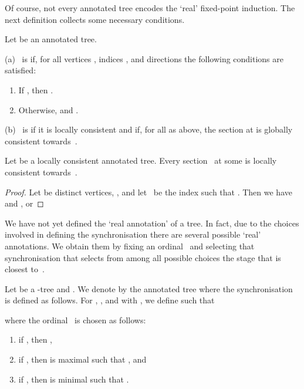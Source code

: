 \documentclass{LMCS}
\begin{document}
\noindent Of course, not every annotated tree 
encodes the `real' fixed-point induction.
The next definition collects some necessary conditions.
\begin{defi}
Let  be an annotated tree.

\textup{(a)}
~is 
if, for all vertices , indices , and directions 
the following conditions are satisfied\?:
\begin{enumerate}
\item If ,
  then .
\item Otherwise, 
  and .
\end{enumerate}

\textup{(b)}
~is 
if it is locally consistent
and if, for all  as above, the section at 
is globally consistent towards~.
\end{defi}

\begin{lem}\label{lem: sections are locally consistent}
Let  be a locally consistent annotated tree.
Every section~ at some  is locally consistent towards~.
\end{lem}
\begin{proof}
Let  be distinct vertices, , and let ~be the index
such that .
Then we have  and , or

\end{proof}

We have not yet defined the `real annotation' of a tree.
In fact, due to the choices involved in defining
the synchronisation there are several possible `real' annotations.
We obtain them by fixing an ordinal~ and selecting
that synchronisation that
selects from among all possible choices
the stage that is closest to~.

\begin{defi}\label{def: betasyndef}
Let  be a -tree and .
We denote by 
the annotated tree 
where the synchronisation~ is defined as follows.
For , ,
and  with ,
we define  such that

where the ordinal~ is chosen as follows\?:
\begin{enumerate}
\item if , then ,
\item if ,
  then  is maximal
  such that , and
\item if ,
  then  is minimal
  such that .
\end{enumerate}
\end{defi}
\end{document}
